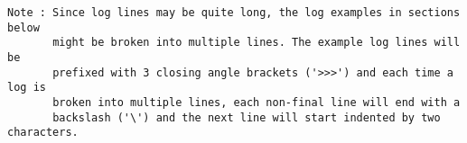 \begin{verbatim}
Note : Since log lines may be quite long, the log examples in sections below
       might be broken into multiple lines. The example log lines will be
       prefixed with 3 closing angle brackets ('>>>') and each time a log is
       broken into multiple lines, each non-final line will end with a
       backslash ('\') and the next line will start indented by two characters.
\end{verbatim}

